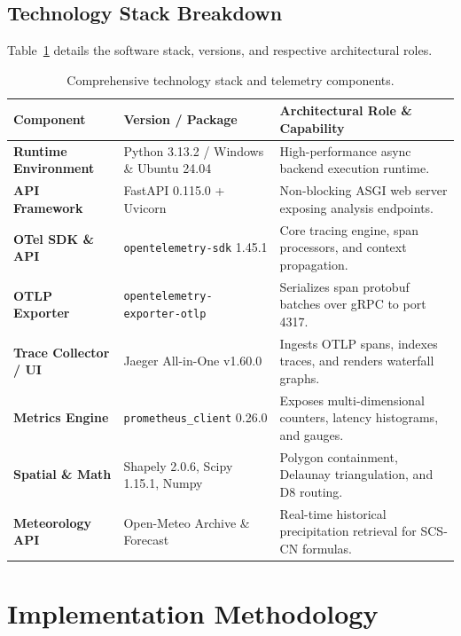 \documentclass[11pt,a4paper]{article}
\begin{document}
\subsection{Technology Stack Breakdown}
Table~\ref{tab:tech_stack} details the software stack, versions, and respective architectural roles.

\begin{table}[H]
    \centering
    \small
    \begin{tabularx}{\textwidth}{l l X}
        \toprule
        \textbf{Component} & \textbf{Version / Package} & \textbf{Architectural Role \& Capability} \\
        \midrule
        \textbf{Runtime Environment} & Python 3.13.2 / Windows \& Ubuntu 24.04 & High-performance async backend execution runtime. \\
        \textbf{API Framework} & FastAPI 0.115.0 + Uvicorn & Non-blocking ASGI web server exposing analysis endpoints. \\
        \textbf{OTel SDK \& API} & \texttt{opentelemetry-sdk} 1.45.1 & Core tracing engine, span processors, and context propagation. \\
        \textbf{OTLP Exporter} & \texttt{opentelemetry-exporter-otlp} & Serializes span protobuf batches over gRPC to port 4317. \\
        \textbf{Trace Collector / UI} & Jaeger All-in-One v1.60.0 & Ingests OTLP spans, indexes traces, and renders waterfall graphs. \\
        \textbf{Metrics Engine} & \texttt{prometheus\_client} 0.26.0 & Exposes multi-dimensional counters, latency histograms, and gauges. \\
        \textbf{Spatial \& Math} & Shapely 2.0.6, Scipy 1.15.1, Numpy & Polygon containment, Delaunay triangulation, and D8 routing. \\
        \textbf{Meteorology API} & Open-Meteo Archive \& Forecast & Real-time historical precipitation retrieval for SCS-CN formulas. \\
        \bottomrule
    \end{tabularx}
    \caption{Comprehensive technology stack and telemetry components.}
    \label{tab:tech_stack}
\end{table}

\section{Implementation Methodology}
\end{document}
